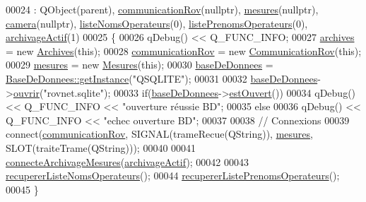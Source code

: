 \begin{DoxyCode}
00024                         : QObject(parent), \hyperlink{class_rov_a8e7aaa17ee2134f26d57241d11ab2a99}{communicationRov}(\textcolor{keyword}{nullptr}), 
      \hyperlink{class_rov_af37589b38493e4bd99702587db2d28a8}{mesures}(\textcolor{keyword}{nullptr}), \hyperlink{class_rov_ad0461ecece812497ee9b4a962f168c18}{camera}(\textcolor{keyword}{nullptr}), \hyperlink{class_rov_a3d424033e0ff00f480a711358ef4fde6}{listeNomsOperateurs}(0), 
      \hyperlink{class_rov_a1e059749c13ed4ee9c0ec9168e79a3be}{listePrenomsOperateurs}(0), \hyperlink{class_rov_a659da5fe3636356b006a8e08a8433dd3}{archivageActif}(1)
00025 \{
00026     qDebug() << Q\_FUNC\_INFO;
00027     \hyperlink{class_rov_ad41ed46f169f28da226a979f70c4d8a4}{archives} = \textcolor{keyword}{new} \hyperlink{class_archives}{Archives}(\textcolor{keyword}{this});
00028     \hyperlink{class_rov_a8e7aaa17ee2134f26d57241d11ab2a99}{communicationRov} = \textcolor{keyword}{new} \hyperlink{class_communication_rov}{CommunicationRov}(\textcolor{keyword}{this});
00029     \hyperlink{class_rov_af37589b38493e4bd99702587db2d28a8}{mesures} = \textcolor{keyword}{new} \hyperlink{class_mesures}{Mesures}(\textcolor{keyword}{this});
00030     \hyperlink{class_rov_a5a9a824cd100947c75d0951eb9e1f90c}{baseDeDonnees} = \hyperlink{class_base_de_donnees_a80028aa2b6b4fbf30fb2e36357b7d3d3}{BaseDeDonnees::getInstance}(\textcolor{stringliteral}{"QSQLITE"});
00031 
00032     \hyperlink{class_rov_a5a9a824cd100947c75d0951eb9e1f90c}{baseDeDonnees}->\hyperlink{class_base_de_donnees_a7f6a5510b08017b0d99115a84252f186}{ouvrir}(\textcolor{stringliteral}{"rovnet.sqlite"});
00033     \textcolor{keywordflow}{if}(\hyperlink{class_rov_a5a9a824cd100947c75d0951eb9e1f90c}{baseDeDonnees}->\hyperlink{class_base_de_donnees_af9ac332082ffd0dd35e412cefabe5e9c}{estOuvert}())
00034         qDebug() << Q\_FUNC\_INFO << \textcolor{stringliteral}{"ouverture réussie BD"};
00035     \textcolor{keywordflow}{else}
00036         qDebug() << Q\_FUNC\_INFO << \textcolor{stringliteral}{"echec ouverture BD"};
00037 
00038     \textcolor{comment}{// Connexions}
00039     connect(\hyperlink{class_rov_a8e7aaa17ee2134f26d57241d11ab2a99}{communicationRov}, SIGNAL(trameRecue(QString)), 
      \hyperlink{class_rov_af37589b38493e4bd99702587db2d28a8}{mesures}, SLOT(traiteTrame(QString)));
00040 
00041     \hyperlink{class_rov_a738965ca84678b506b3d6a326c48e9e3}{connecteArchivageMesures}(\hyperlink{class_rov_a659da5fe3636356b006a8e08a8433dd3}{archivageActif});
00042 
00043     \hyperlink{class_rov_a490eefb90bf28e83f181d770f0f52446}{recupererListeNomsOperateurs}();
00044     \hyperlink{class_rov_a84dece742f5c4c903ada4f25c869597f}{recupererListePrenomsOperateurs}();
00045 \}
\end{DoxyCode}
\mbox{\label{class_rov_a6e41f712195b9af74fd75b781745d1b5}} 
